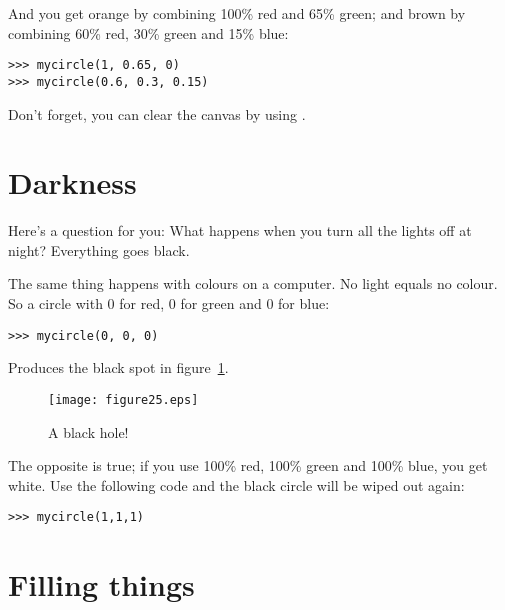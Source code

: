 \noindent
And you get orange by combining 100\% red and 65\% green; and brown by combining 60\% red, 30\% green and 15\% blue:

\begin{listing}
\begin{verbatim}
>>> mycircle(1, 0.65, 0)
>>> mycircle(0.6, 0.3, 0.15)
\end{verbatim}
\end{listing}

\noindent
Don't forget, you can clear the canvas by using .

\section{Darkness}

Here's a question for you:  What happens when you turn all the lights off at night? Everything goes black.
\par
The same thing happens with colours on a computer.  No light equals no colour.  So a circle with 0 for red, 0 for green and 0 for blue:

\begin{listing}
\begin{verbatim}
>>> mycircle(0, 0, 0)
\end{verbatim}
\end{listing}

Produces the black spot in figure~\ref{fig25}.

\begin{figure}
\begin{center}
\texttt{[image: figure25.eps]}
\end{center}
\caption{A black hole!}\label{fig25}
\end{figure}

The opposite is true; if you use 100\% red, 100\% green and 100\% blue, you get white.  Use the following code and the black circle will be wiped out again:

\begin{listing}
\begin{verbatim}
>>> mycircle(1,1,1)
\end{verbatim}
\end{listing}

\section{Filling things}

